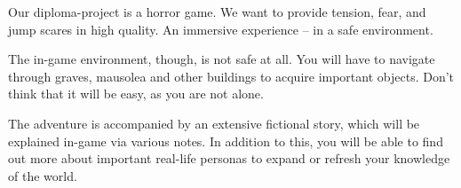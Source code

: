 Our diploma-project is a horror game. We want to provide tension, fear, and jump scares in high quality. An immersive experience – in a safe environment.

The in-game environment, though, is not safe at all. You will have to navigate through graves, mausolea and other buildings to acquire important objects. Don’t think that it will be easy, as you are not alone.

The adventure is accompanied by an extensive fictional story, which will be explained in-game via various notes. In addition to this, you will be able to find out more about important real-life personas to expand or refresh your knowledge of the world.


